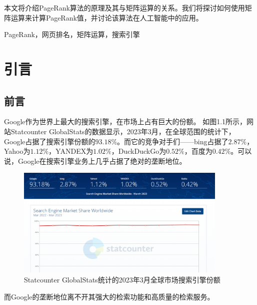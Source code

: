 \documentclass[UTF8,openany]{ctexbook}
\begin{document}
本文将介绍PageRank算法的原理及其与矩阵运算的关系。我们将探讨如何使用矩阵运算来计算PageRank值，并讨论该算法在人工智能中的应用。
\bigskip

PageRank，网页排名，矩阵运算，搜索引擎
\songti
\setcounter{page}{1}

\newpage

\tableofcontents
\thispagestyle{fancy}

\newpage

\listoffigures
\thispagestyle{fancy}

\newpage
{}
\setcounter{page}{1}
\chapter[引言]{引言}
\thispagestyle{fancy}
\section[前言]{前言}
Google作为世界上最大的搜索引擎，在市场上占有巨大的份额。
如图1.1所示，网站Statcounter GlobalStats的数据显示\cite{bi:SG}，2023年3月，在全球范围的统计下，Google占据了搜索引擎份额的$93.18\%$。而它的竞争对手们——bing占据了$2.87\%$，Yahoo为$1.12\%$，YANDEX为$1.02\%$，DuckDuckGo为$0.52\%$，百度为$0.42\%$。可以说，Google在搜索引擎业务上几乎占据了绝对的垄断地位。
\begin{figure}[H]
    \begin{center}
        \includegraphics[width=0.9\textwidth]{images/statcounter.png}
        \caption{Statcounter GlobalStats统计的2023年3月全球市场搜索引擎份额}
    \end{center}
\end{figure}

而Google的垄断地位离不开其强大的检索功能和高质量的检索服务。
\end{document}
